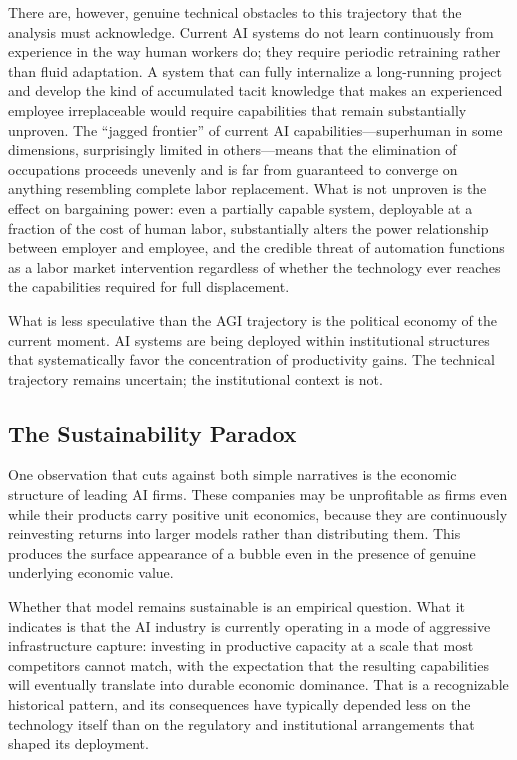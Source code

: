 \documentclass[12pt, a4paper]{article}
\theoremstyle{plain}
\theoremstyle{definition}
\theoremstyle{remark}
\begin{document}
There are, however, genuine technical obstacles to this trajectory that the analysis
must acknowledge.
Current AI systems do not learn continuously from experience in the way human workers
do; they require periodic retraining rather than fluid adaptation.
A system that can fully internalize a long-running project and develop the kind of
accumulated tacit knowledge that makes an experienced employee irreplaceable would
require capabilities that remain substantially unproven.
The ``jagged frontier'' of current AI capabilities---superhuman in some dimensions,
surprisingly limited in others---means that the elimination of occupations proceeds
unevenly and is far from guaranteed to converge on anything resembling complete
labor replacement.
What is not unproven is the effect on bargaining power: even a partially capable
system, deployable at a fraction of the cost of human labor, substantially alters
the power relationship between employer and employee, and the credible threat of
automation functions as a labor market intervention regardless of whether the
technology ever reaches the capabilities required for full displacement.

What is less speculative than the AGI trajectory is the political economy of the
current moment.
AI systems are being deployed within institutional structures that systematically
favor the concentration of productivity gains.
The technical trajectory remains uncertain; the institutional context is not.

\subsection{The Sustainability Paradox}

One observation that cuts against both simple narratives is the economic structure
of leading AI firms.
These companies may be unprofitable as firms even while their products carry
positive unit economics, because they are continuously reinvesting returns into
larger models rather than distributing them.
This produces the surface appearance of a bubble even in the presence of genuine
underlying economic value.

Whether that model remains sustainable is an empirical question.
What it indicates is that the AI industry is currently operating in a mode of
aggressive infrastructure capture: investing in productive capacity at a scale
that most competitors cannot match, with the expectation that the resulting
capabilities will eventually translate into durable economic dominance.
That is a recognizable historical pattern, and its consequences have typically
depended less on the technology itself than on the regulatory and institutional
arrangements that shaped its deployment.
\end{document}
